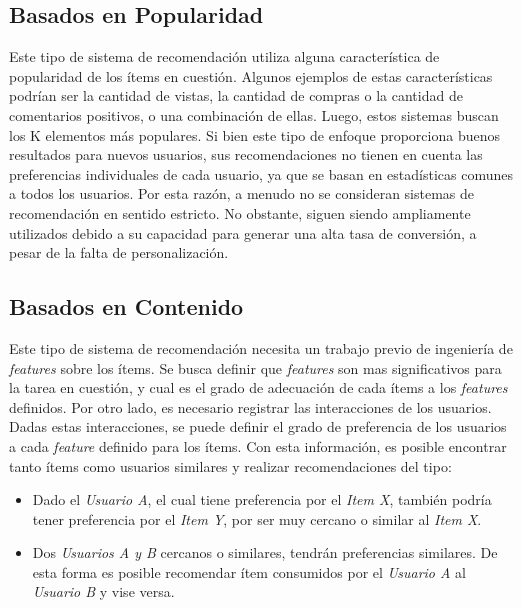 \documentclass[11pt,a4paper,twoside]{thesis}
\begin{document}
\subsection{Basados en Popularidad}

Este tipo de sistema de recomendación utiliza alguna característica de
popularidad de los ítems en cuestión. Algunos ejemplos de estas características
podrían ser la cantidad de vistas, la cantidad de compras o la cantidad de
comentarios positivos, o una combinación de ellas. Luego, estos sistemas buscan
los K elementos más populares. Si bien este tipo de enfoque proporciona buenos
resultados para nuevos usuarios, sus recomendaciones no tienen en cuenta las
preferencias individuales de cada usuario, ya que se basan en estadísticas
comunes a todos los usuarios. Por esta razón, a menudo no se consideran
sistemas de recomendación en sentido estricto. No obstante, siguen siendo
ampliamente utilizados debido a su capacidad para generar una alta tasa de
conversión, a pesar de la falta de personalización.

\subsection{Basados en Contenido}

Este tipo de sistema de recomendación necesita un trabajo previo de ingeniería
de \textit{features} sobre los ítems. Se busca definir que \textit{features}
son mas significativos para la tarea en cuestión, y cual es el grado de
adecuación de cada ítems a los \textit{features} definidos. Por otro lado, es
necesario registrar las interacciones de los usuarios. Dadas estas
interacciones, se puede definir el grado de preferencia de los usuarios a cada
\textit{feature} definido para los ítems. Con esta información, es posible
encontrar tanto ítems como usuarios similares y realizar recomendaciones del
tipo:

\begin{itemize}
	\item Dado el \textit{Usuario A}, el cual tiene preferencia por el \textit{Item X},
	      también podría tener preferencia por el \textit{Item Y}, por ser muy cercano o
	      similar al \textit{Item X}.
	\item Dos \textit{Usuarios A y B} cercanos o similares, tendrán preferencias
	      similares. De esta forma es posible recomendar ítem consumidos por el
	      \textit{Usuario A} al \textit{Usuario B} y vise versa.
\end{itemize}
\end{document}
